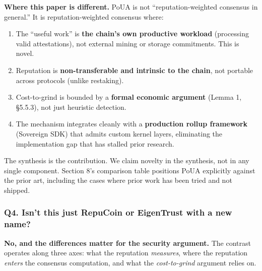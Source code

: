 \documentclass[
  11pt,
]{article}
\providecommand{\tightlist}{%
  \setlength{\itemsep}{0pt}\setlength{\parskip}{0pt}}
\begin{document}
\textbf{Where this paper is different.} PoUA is not
``reputation-weighted consensus in general.'' It is reputation-weighted
consensus where:

\begin{enumerate}
\def\labelenumi{\arabic{enumi}.}
\tightlist
\item
  The ``useful work'' is \textbf{the chain's own productive workload}
  (processing valid attestations), not external mining or storage
  commitments. This is novel.
\item
  Reputation is \textbf{non-transferable and intrinsic to the chain},
  not portable across protocols (unlike restaking).
\item
  Cost-to-grind is bounded by a \textbf{formal economic argument} (Lemma
  1, §5.5.3), not just heuristic detection.
\item
  The mechanism integrates cleanly with a \textbf{production rollup
  framework} (Sovereign SDK) that admits custom kernel layers,
  eliminating the implementation gap that has stalled prior research.
\end{enumerate}

The synthesis is the contribution. We claim novelty in the synthesis,
not in any single component. Section 8's comparison table positions PoUA
explicitly against the prior art, including the cases where prior work
has been tried and not shipped.

\subsubsection{Q4. Isn't this just RepuCoin or EigenTrust with a new
name?}\label{q4.-isnt-this-just-repucoin-or-eigentrust-with-a-new-name}

\textbf{No, and the differences matter for the security argument.} The
contrast operates along three axes: what the reputation \emph{measures},
where the reputation \emph{enters} the consensus computation, and what
the \emph{cost-to-grind} argument relies on.
\end{document}
